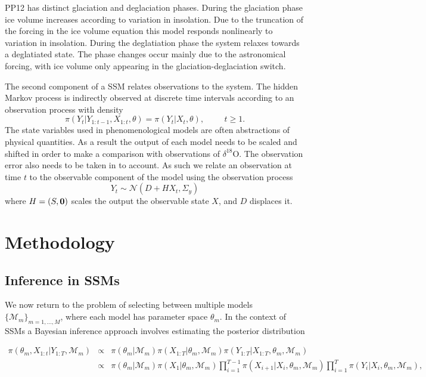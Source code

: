 \documentclass[a4paper,12pt]{article}
\begin{document}
PP12 \cite{Parrenin2012} has distinct glaciation and deglaciation phases.
During the glaciation phase ice volume increases according to variation in insolation.
Due to the truncation of the forcing in the ice volume equation this model responds nonlinearly to variation in insolation.
During the deglatiation phase the system relaxes towards a deglatiated state.
The phase changes occur mainly due to the astronomical forcing, with ice volume only appearing in the glaciation-deglaciation switch.

The second component of a SSM relates observations to the system.
The hidden Markov process is indirectly observed at discrete time intervals according to an observation process with density 
\begin{equation}
\pi (Y_t \vert Y_{1:t-1}, X_{1:t}, \theta) = \pi (Y_t \vert X_t, \theta), \hspace{1cm} t \geq 1 .
\end{equation}
\noindent The state variables used in phenomenological models are often abstractions of physical quantities.
As a result the output of each model needs to be scaled and shifted in order to make a comparison with observations of $\delta^{18}$O.
The observation error also needs to be taken in to account.
As such we relate an observation at time $t$ to the observable component of the model using the observation process
\[ Y_t \sim \mathcal{N} ( D + H X_t, \Sigma_y) \]
\noindent where $H=(S,{\bf 0})$ scales the output the observable state $X$, and $D$ displaces it.

\color{black}
\section{Methodology}
\label{Sec:Meth}

\subsection{Inference in SSMs}

We now return to the problem of selecting between multiple models $\{\mathcal{M}_m\}_{m=1,...,M}$, where each model has parameter space $\theta_m$.
In the context of SSMs a Bayesian inference approach involves estimating the posterior distribution

\begin{eqnarray*}
\pi(\theta_m, X_{1:t} \vert Y_{1:T}, \mathcal{M}_m) & \propto & \pi(\theta_m \vert \mathcal{M}_m) \pi(X_{1:T} \vert \theta_m, \mathcal{M}_m) \pi(Y_{1:T} \vert X_{1:T}, \theta_m, \mathcal{M}_m)\\
& \propto & \pi(\theta_m \vert \mathcal{M}_m) \pi(X_1 \vert \theta_m, \mathcal{M}_m) \prod_{i=1}^{T-1} \pi(X_{i+1} \vert X_i, \theta_m, \mathcal{M}_m) \prod_{i=1}^T \pi(Y_i \vert X_i, \theta_m, \mathcal{M}_m),
\end{eqnarray*}
\end{document}

